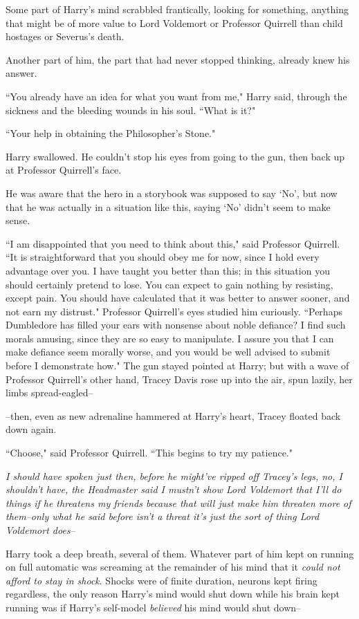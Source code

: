 Some part of Harry's mind scrabbled frantically, looking for something, anything that might be of more value to Lord Voldemort or Professor Quirrell than child hostages or Severus's death.

Another part of him, the part that had never stopped thinking, already knew his answer.

``You already have an idea for what you want from me," Harry said, through the sickness and the bleeding wounds in his soul. ``What is it?"

``Your help in obtaining the Philosopher's Stone."

Harry swallowed. He couldn't stop his eyes from going to the gun, then back up at Professor Quirrell's face.

He was aware that the hero in a storybook was supposed to say `No', but now that he was actually in a situation like this, saying `No' didn't seem to make sense.

``I am disappointed that you need to think about this," said Professor Quirrell. ``It is straightforward that you should obey me for now, since I hold every advantage over you. I have taught you better than this; in this situation you should certainly pretend to lose. You can expect to gain nothing by resisting, except pain. You should have calculated that it was better to answer sooner, and not earn my distrust." Professor Quirrell's eyes studied him curiously. ``Perhaps Dumbledore has filled your ears with nonsense about noble defiance? I find such morals amusing, since they are so easy to manipulate. I assure you that I can make defiance seem morally worse, and you would be well advised to submit before I demonstrate how." The gun stayed pointed at Harry; but with a wave of Professor Quirrell's other hand, Tracey Davis rose up into the air, spun lazily, her limbs spread-eagled\---

\---then, even as new adrenaline hammered at Harry's heart, Tracey floated back down again.

``Choose," said Professor Quirrell. ``This begins to try my patience."

\emph{I should have spoken just then, before he might've ripped off Tracey's legs, no, I shouldn't have, the Headmaster said I mustn't show Lord Voldemort that I'll do things if he threatens my friends because that will just make him threaten more of them\---only what he said before isn't a \emph{threat} it's just the sort of thing Lord Voldemort \emph{does}\---}

Harry took a deep breath, several of them. Whatever part of him kept on running on full automatic was screaming at the remainder of his mind that it \emph{could not afford to stay in shock}. Shocks were of finite duration, neurons kept firing regardless, the only reason Harry's mind would shut down while his brain kept running was if Harry's self-model \emph{believed} his mind would shut down\---

